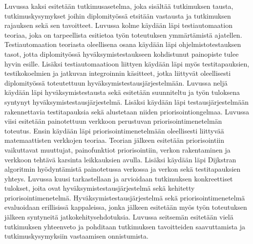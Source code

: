 Luvussa kaksi esitetään tutkimusasetelma, joka sisältää tutkimuksen tausta, tutkimuskysymykset joihin diplomityössä etsitään vastausta ja tutkimuksen rajauksen sekä sen tavoitteet.
Luvussa kolme käydään läpi testiautomaation teoriaa, joka on tarpeellista esitietoa työn toteutuksen ymmärtämistä ajatellen.
Testiautomaation teoriasta oleellisena osana käydään läpi ohjelmistotestauksen tasot, jotta diplomityössä hyväksymistestaukseen kohdistunut painopiste tulee hyvin esille.
Lisäksi testiautomaatioon liittyen käydään läpi myös testitapauksien, testikokoelmien ja jatkuvan integroinnin käsitteet, jotka liittyvät oleellisesti diplomityössä toteutettuun hyväksymistestausjärjestelmään.
Luvussa neljä käydään läpi hyväksymistestausta sekä esitetään suunniteltu ja työn tuloksena syntynyt hyväksymistestausjärjestelmä.
Lisäksi käydään läpi testausjärjestelmään rakennettavia testitapauksia sekä alustetaan niiden priorisointiongelmaa.
Luvussa viisi esitetään painotettuun verkkoon perustuvan priorisointimenetelmän toteutus.
Ensin käydään läpi priorisointimenetelmään oleellisesti liittyvää matemaattisten verkkojen teoriaa.
Teorian jälkeen esitetään priorisointiin vaikuttavat muuttujat, painofunktiot priorisointiin, verkon rakentaminen ja verkkoon tehtävä karsinta leikkauksien avulla.
Lisäksi käydään läpi Dijkstran algoritmin hyödyntämistä painotetussa verkossa ja verkon sekä testitapauksien yhteys.
Luvussa kuusi tarkastellaan ja arvioidaan tutkimuksen konkreettiset tulokset, joita ovat hyväksymistestausjärjestelmä sekä kehitetty priorisointimenetelmä.
Hyväksymistestausjärjestelmä sekä priorisointimenetelmä evaluoidaan erillisissä kappaleissa, jonka jälkeen esitetään myös työn toteutuksen jälkeen syntyneitä jatkokehitysehdotuksia.
Luvussa seitsemän esitetään vielä tutkimuksen yhteenveto ja pohditaan tutkimuksen tavoitteiden saavuttamista ja tutkimuskysymyksiin vastaamisen onnistumista.
